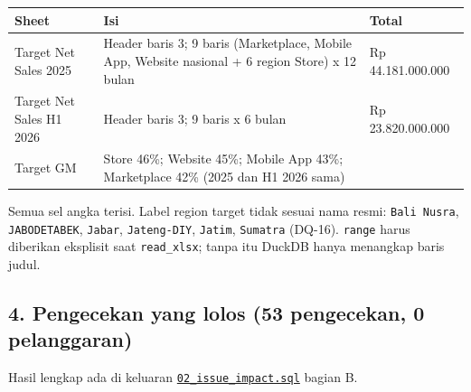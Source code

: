 \documentclass[10pt,a4paper]{article}
\begin{document}
{\def\LTcaptype{none} %
\begin{longtable}[]{@{}
  >{\raggedright\arraybackslash}p{}
  >{\raggedright\arraybackslash}p{}
  >{\raggedleft\arraybackslash}p{}@{}}
\toprule\noalign{}
\begin{minipage}[b]{\linewidth}\raggedright
Sheet
\end{minipage} & \begin{minipage}[b]{\linewidth}\raggedright
Isi
\end{minipage} & \begin{minipage}[b]{\linewidth}\raggedleft
Total
\end{minipage} \\
\midrule\noalign{}
\endhead
\bottomrule\noalign{}
\endlastfoot
Target Net Sales 2025 & Header baris 3; 9 baris (Marketplace, Mobile App, Website nasional + 6 region Store) x 12 bulan & Rp 44.181.000.000 \\
Target Net Sales H1 2026 & Header baris 3; 9 baris x 6 bulan & Rp 23.820.000.000 \\
Target GM & Store 46\%; Website 45\%; Mobile App 43\%; Marketplace 42\% (2025 dan H1 2026 sama) & \\
\end{longtable}
}

Semua sel angka terisi. Label region target tidak sesuai nama resmi: \texttt{Bali\ Nusra}, \texttt{JABODETABEK}, \texttt{Jabar},
\texttt{Jateng-DIY}, \texttt{Jatim}, \texttt{Sumatra} (DQ-16). \texttt{range} harus diberikan eksplisit saat \texttt{read\_\allowbreak{}xlsx}; tanpa itu
DuckDB hanya menangkap baris judul.

\subsection{4. Pengecekan yang lolos (53 pengecekan, 0 pelanggaran)}\label{pengecekan-yang-lolos-53-pengecekan-0-pelanggaran}

Hasil lengkap ada di keluaran \href{https://github.com/titan2903/kirana-omnichannel-performance-intelligence/blob/master/sql/profiling/02_issue_impact.sql}{\texttt{02\_\allowbreak{}issue\_\allowbreak{}impact.sql}} bagian B.
\end{document}
